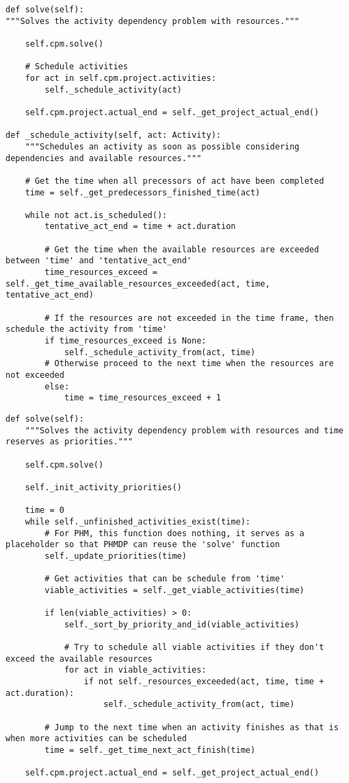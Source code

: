 \begin{lstlisting}[caption={The core functions of SHM: \code{solve()} and \code{\_schedule\_activity()}. Note that unimportant functions have been omitted for brevity.},label={Listing:implementation->shm->solve-function}]
def solve(self):
"""Solves the activity dependency problem with resources."""
	
	self.cpm.solve()
	
	# Schedule activities
	for act in self.cpm.project.activities:
		self._schedule_activity(act)
	
	self.cpm.project.actual_end = self._get_project_actual_end()
	
def _schedule_activity(self, act: Activity):
	"""Schedules an activity as soon as possible considering dependencies and available resources."""

	# Get the time when all precessors of act have been completed
	time = self._get_predecessors_finished_time(act)
	
	while not act.is_scheduled():
		tentative_act_end = time + act.duration
		
		# Get the time when the available resources are exceeded between 'time' and 'tentative_act_end'
		time_resources_exceed = self._get_time_available_resources_exceeded(act, time, tentative_act_end)
		
		# If the resources are not exceeded in the time frame, then schedule the activity from 'time'
		if time_resources_exceed is None:
			self._schedule_activity_from(act, time)
		# Otherwise proceed to the next time when the resources are not exceeded
		else:
			time = time_resources_exceed + 1
\end{lstlisting}

\begin{lstlisting}[caption={The core function of PHM: \code{solve()}.},label={Listing:implementation->phm->solve-function}]
def solve(self):
	"""Solves the activity dependency problem with resources and time reserves as priorities."""
	
	self.cpm.solve()
	
	self._init_activity_priorities()
	
	time = 0
	while self._unfinished_activities_exist(time):
		# For PHM, this function does nothing, it serves as a placeholder so that PHMDP can reuse the 'solve' function
		self._update_priorities(time)
		
		# Get activities that can be schedule from 'time'
		viable_activities = self._get_viable_activities(time)
		
		if len(viable_activities) > 0:
			self._sort_by_priority_and_id(viable_activities)
			
			# Try to schedule all viable activities if they don't exceed the available resources
			for act in viable_activities:
				if not self._resources_exceeded(act, time, time + act.duration):
					self._schedule_activity_from(act, time)
		
		# Jump to the next time when an activity finishes as that is when more activities can be scheduled
		time = self._get_time_next_act_finish(time)
	
	self.cpm.project.actual_end = self._get_project_actual_end()
\end{lstlisting}

